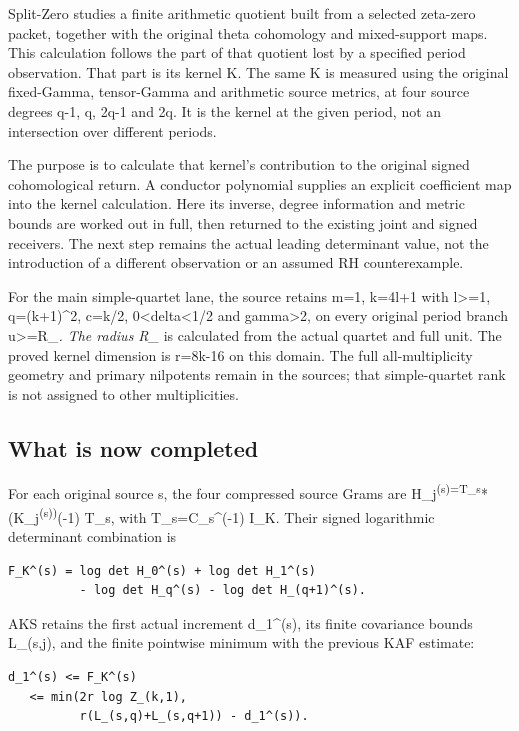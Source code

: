 \documentclass[
]{article}
\begin{document}
Split-Zero studies a finite arithmetic quotient built from a selected
zeta-zero packet, together with the original theta cohomology and
mixed-support maps. This calculation follows the part of that quotient
lost by a specified period observation. That part is its kernel K. The
same K is measured using the original fixed-Gamma, tensor-Gamma and
arithmetic source metrics, at four source degrees q-1, q, 2q-1 and 2q.
It is the kernel at the given period, not an intersection over different
periods.

The purpose is to calculate that kernel's contribution to the original
signed cohomological return. A conductor polynomial supplies an explicit
coefficient map into the kernel calculation. Here its inverse, degree
information and metric bounds are worked out in full, then returned to
the existing joint and signed receivers. The next step remains the
actual leading determinant value, not the introduction of a different
observation or an assumed RH counterexample.

For the main simple-quartet lane, the source retains m=1, k=4l+1 with
l\textgreater=1, q=(k+1)\^{}2, c=k/2, 0\textless delta\textless1/2 and
gamma\textgreater2, on every original period branch
\textbar u\textbar\textgreater=R\_\emph{. The radius R\_} is calculated
from the actual quartet and full unit. The proved kernel dimension is
r=8k-16 on this domain. The full all-multiplicity geometry and primary
nilpotents remain in the sources; that simple-quartet rank is not
assigned to other multiplicities.

\subsection{What is now completed}\label{what-is-now-completed}

For each original source s, the four compressed source Grams are
H\_j\textsuperscript{(s)=T\_s}* (K\_j\textsuperscript{(s))}(-1) T\_s,
with T\_s=C\_s\^{}(-1) I\_K. Their signed logarithmic determinant
combination is

\begin{verbatim}
F_K^(s) = log det H_0^(s) + log det H_1^(s)
          - log det H_q^(s) - log det H_(q+1)^(s).
\end{verbatim}

AKS retains the first actual increment d\_1\^{}(s), its finite
covariance bounds L\_(s,j), and the finite pointwise minimum with the
previous KAF estimate:

\begin{verbatim}
d_1^(s) <= F_K^(s)
   <= min(2r log Z_(k,1),
          r(L_(s,q)+L_(s,q+1)) - d_1^(s)).
\end{verbatim}
\end{document}
